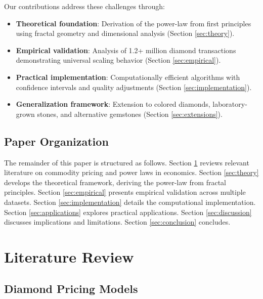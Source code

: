 \documentclass[12pt,a4paper]{article}
\begin{document}
Our contributions address these challenges through:

\begin{itemize}
    \item \textbf{Theoretical foundation}: Derivation of the power-law from first principles using fractal geometry and dimensional analysis (Section \ref{sec:theory}).
    
    \item \textbf{Empirical validation}: Analysis of 1.2+ million diamond transactions demonstrating universal scaling behavior (Section \ref{sec:empirical}).
    
    \item \textbf{Practical implementation}: Computationally efficient algorithms with confidence intervals and quality adjustments (Section \ref{sec:implementation}).
    
    \item \textbf{Generalization framework}: Extension to colored diamonds, laboratory-grown stones, and alternative gemstones (Section \ref{sec:extensions}).
\end{itemize}

\subsection{Paper Organization}

The remainder of this paper is structured as follows. Section \ref{sec:literature} reviews relevant literature on commodity pricing and power laws in economics. Section \ref{sec:theory} develops the theoretical framework, deriving the power-law from fractal principles. Section \ref{sec:empirical} presents empirical validation across multiple datasets. Section \ref{sec:implementation} details the computational implementation. Section \ref{sec:applications} explores practical applications. Section \ref{sec:discussion} discusses implications and limitations. Section \ref{sec:conclusion} concludes.

\section{Literature Review}
\label{sec:literature}

\subsection{Diamond Pricing Models}
\end{document}
